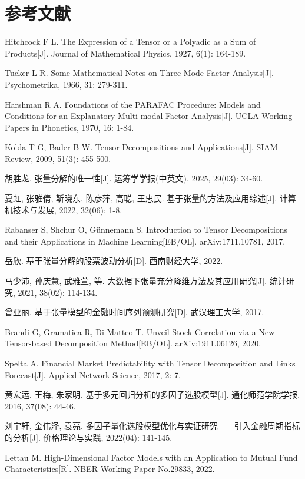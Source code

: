\chapter*{参考文献}
\sloppy
\begin{enumerate}[label={[\arabic*]}]
  \item Hitchcock F L. The Expression of a Tensor or a Polyadic as a Sum of Products[J]. Journal of Mathematical Physics, 1927, 6(1): 164-189.
  \item Tucker L R. Some Mathematical Notes on Three-Mode Factor Analysis[J]. Psychometrika, 1966, 31: 279-311.
  \item Harshman R A. Foundations of the PARAFAC Procedure: Models and Conditions for an Explanatory Multi-modal Factor Analysis[J]. UCLA Working Papers in Phonetics, 1970, 16: 1-84.
  \item Kolda T G, Bader B W. Tensor Decompositions and Applications[J]. SIAM Review, 2009, 51(3): 455-500.
  \item 胡胜龙. 张量分解的唯一性[J]. 运筹学学报(中英文), 2025, 29(03): 34-60.
  \item 夏虹, 张雅倩, 靳晓东, 陈彦萍, 高聪, 王忠民. 基于张量的方法及应用综述[J]. 计算机技术与发展, 2022, 32(06): 1-8.
  \item Rabanser S, Shchur O, Günnemann S. Introduction to Tensor Decompositions and their Applications in Machine Learning[EB/OL]. arXiv:1711.10781, 2017.
  \item 岳欣. 基于张量分解的股票波动分析[D]. 西南财经大学, 2022.
  \item 马少沛, 孙庆慧, 武雅萱, 等. 大数据下张量充分降维方法及其应用研究[J]. 统计研究, 2021, 38(02): 114-134.
  \item 曾亚丽. 基于张量模型的金融时间序列预测研究[D]. 武汉理工大学, 2017.
  \item Brandi G, Gramatica R, Di Matteo T. Unveil Stock Correlation via a New Tensor-based Decomposition Method[EB/OL]. arXiv:1911.06126, 2020.
  \item Spelta A. Financial Market Predictability with Tensor Decomposition and Links Forecast[J]. Applied Network Science, 2017, 2: 7.
  \item 黄宏运, 王梅, 朱家明. 基于多元回归分析的多因子选股模型[J]. 通化师范学院学报, 2016, 37(08): 44-46.
  \item 刘宇轩, 金伟泽, 袁亮. 多因子量化选股模型优化与实证研究——引入金融周期指标的分析[J]. 价格理论与实践, 2022(04): 141-145.
  \item Lettau M. High-Dimensional Factor Models with an Application to Mutual Fund Characteristics[R]. NBER Working Paper No.29833, 2022.

\end{enumerate}
